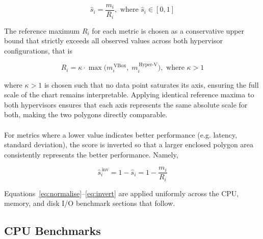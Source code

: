 \documentclass[a4paper, 12pt]{article}
\theoremstyle{plain}
\theoremstyle{definition}
\theoremstyle{remark}
\begin{document}
    \begin{equation}
        \hat{s}_i = \frac{m_i}{R_i},\text{ where }\hat{s}_i \in [0, 1]
        \label{eq:normalise}
    \end{equation}

    \noindent The reference maximum $R_i$ for each metric is chosen as a
    conservative upper bound that strictly exceeds all observed values across both
    hypervisor configurations, that is

    \begin{equation}
        R_i = \kappa \cdot \max\bigl(m_i^{\,\text{VBox}},\; m_i^{\,\text{Hyper-V}}\bigr),
        \text{ where }\kappa > 1
        \label{eq:refmax}
    \end{equation}

    \noindent \noindent where $\kappa > 1$ is chosen such that no data point saturates its 
    axis, ensuring the full scale of the chart remains interpretable.
    Applying identical reference maxima to both hypervisors ensures that each axis 
    represents the same absolute scale for both, making the two polygons directly 
    comparable.\\
    \\
    \noindent For metrics where a lower value indicates better performance (e.g. 
    latency, standard deviation), the score is inverted so that a larger enclosed
    polygon area consistently represents the better performance. Namely,

    \begin{equation}
        \hat{s}_i^{\,\text{inv}} = 1 - \hat{s}_i = 1 - \frac{m_i}{R_i}
        \label{eq:invert}
    \end{equation}

    \noindent Equations~\eqref{eq:normalise}--\eqref{eq:invert} are applied
    uniformly across the CPU, memory, and disk I/O benchmark sections that follow.

    \subsection{CPU Benchmarks}
\end{document}

